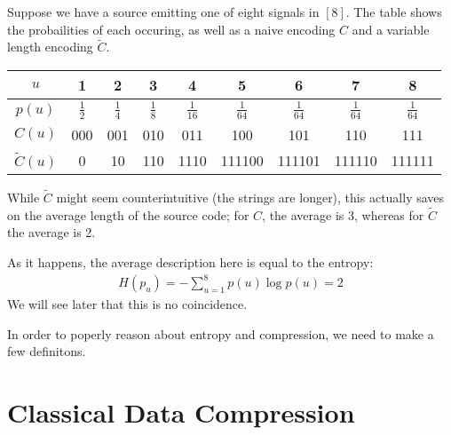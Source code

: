 \documentclass[]{article}
\begin{document}
\begin{remark*}
    Suppose we have a source emitting one of eight signals in $[8]$. The table shows the probailities of each occuring, as well as a naive encoding $C$ and a variable length encoding $\tilde{C}$.

    \begin{center}
        \begin{tabular}{|c|c|c|c|c|c|c|c|c|} \hline
             $u$ &1 & 2 & 3 & 4 & 5& 6 & 7 & 8 \\ \hline
             $p(u)$ & $\frac{1}{2}$ & $\frac{1}{4}$ & $\frac{1}{8}$ & $\frac{1}{16}$ & $\frac{1}{64}$ & $\frac{1}{64}$ & $\frac{1}{64}$ & $\frac{1}{64}$\\ \hline
             $C(u)$ & 000 & 001 & 010 & 011 & 100 & 101 & 110 & 111\\ \hline
             $\tilde{C}(u)$ & 0 & 10 & 110 & 1110 & 111100 & 111101 & 111110 & 111111 \\ \hline
        \end{tabular}
    \end{center}

    While $\tilde{C}$ might seem counterintuitive (the strings are longer), this actually saves on the average length of the source code; for $C$, the average is $3$, whereas for $\tilde{C}$ the average is 2.

    As it happens, the average description here is equal to the entropy:
    \begin{align*}
        H(p_u) = -\sum_{u=1}^{8}p(u)\log p(u) = 2
    \end{align*}
    We will see later that this is no coincidence.
\end{remark*}

In order to poperly reason about entropy and compression, we need to make a few definitons.

\section{Classical Data Compression}
\end{document}
